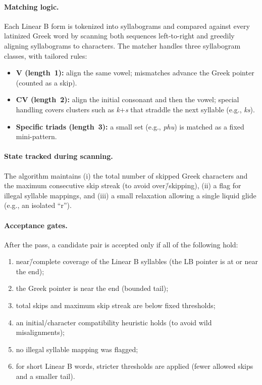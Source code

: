 \paragraph{Matching logic.}
Each Linear B form is tokenized into syllabograms and compared against every latinized Greek word by
scanning both sequences left-to-right and greedily aligning syllabograms to characters.
The matcher handles three syllabogram classes, with tailored rules:
\begin{itemize}[leftmargin=2em]
  \item \textbf{V (length~1):} align the same vowel; mismatches advance the Greek pointer (counted as a skip).
  \item \textbf{CV (length~2):} align the initial consonant and then the vowel; special handling covers clusters
        such as \textit{k}+\textit{s} that straddle the next syllable (e.g., \textit{ks}).
  \item \textbf{Specific triads (length~3):} a small set (e.g., \textit{phu}) is matched as a fixed mini-pattern.
\end{itemize}

\paragraph{State tracked during scanning.}
The algorithm maintains (i) the total number of skipped Greek characters and the maximum consecutive
skip streak (to avoid over\=/skipping), (ii) a flag for illegal syllable mappings, and (iii) a small
relaxation allowing a single liquid glide (e.g., an isolated ``r'').

\paragraph{Acceptance gates.}
After the pass, a candidate pair is accepted only if all of the following hold:
\begin{enumerate}[label=(\roman*), leftmargin=2em]
  \item near\=/complete coverage of the Linear B syllables (the LB pointer is at or near the end);
  \item the Greek pointer is near the end (bounded tail);
  \item total skips and maximum skip streak are below fixed thresholds;
  \item an initial\-/character compatibility heuristic holds (to avoid wild misalignments);
  \item no illegal syllable mapping was flagged;
  \item for short Linear B words, stricter thresholds are applied (fewer allowed skips and a smaller tail).
\end{enumerate}

